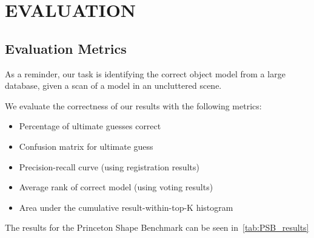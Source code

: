 \section{EVALUATION}

\subsection{Evaluation Metrics}
As a reminder, our task is identifying the correct object model from a large database, given a scan of a model in an uncluttered scene.

We evaluate the correctness of our results with the following metrics:
\begin{itemize}
  \item Percentage of ultimate guesses correct
  \item Confusion matrix for ultimate guess
  \item Precision-recall curve (using registration results)
  \item Average rank of correct model (using voting results)
  \item Area under the cumulative result-within-top-K histogram
\end{itemize}

The results for the Princeton Shape Benchmark can be seen in~\ref{tab:PSB_results}

